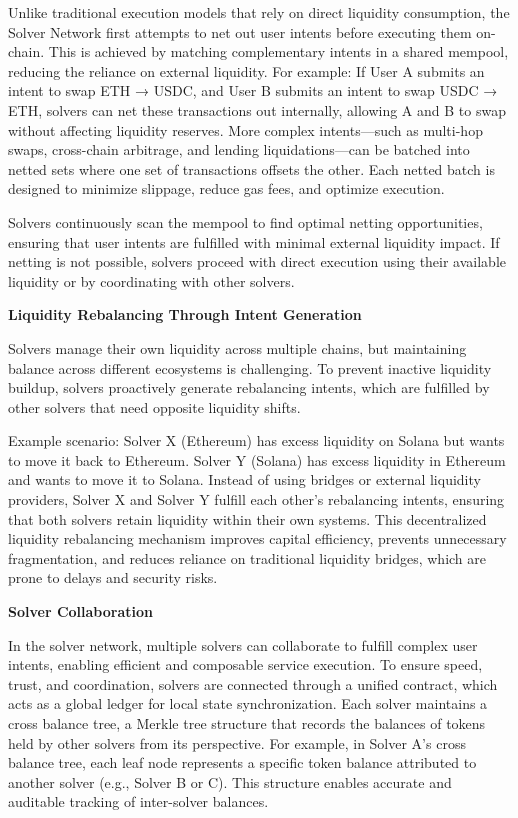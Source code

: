 Unlike traditional execution models that rely on direct liquidity consumption, the Solver Network first attempts to net out user intents before executing them on-chain. This is achieved by matching complementary intents in a shared mempool, reducing the reliance on external liquidity. For example: If User A submits an intent to swap ETH → USDC, and User B submits an intent to swap USDC → ETH, solvers can net these transactions out internally, allowing A and B to swap without affecting liquidity reserves. More complex intents—such as multi-hop swaps, cross-chain arbitrage, and lending liquidations—can be batched into netted sets where one set of transactions offsets the other. Each netted batch is designed to minimize slippage, reduce gas fees, and optimize execution.

Solvers continuously scan the mempool to find optimal netting opportunities, ensuring that user intents are fulfilled with minimal external liquidity impact. If netting is not possible, solvers proceed with direct execution using their available liquidity or by coordinating with other solvers.

\textbf{Liquidity Rebalancing Through Intent Generation}

Solvers manage their own liquidity across multiple chains, but maintaining balance across different ecosystems is challenging. To prevent inactive liquidity buildup, solvers proactively generate rebalancing intents, which are fulfilled by other solvers that need opposite liquidity shifts.

Example scenario: Solver X (Ethereum) has excess liquidity on Solana but wants to move it back to Ethereum. Solver Y (Solana) has excess liquidity in Ethereum and wants to move it to Solana.
Instead of using bridges or external liquidity providers, Solver X and Solver Y fulfill each other's rebalancing intents, ensuring that both solvers retain liquidity within their own systems. This decentralized liquidity rebalancing mechanism improves capital efficiency, prevents unnecessary fragmentation, and reduces reliance on traditional liquidity bridges, which are prone to delays and security risks.

\textbf{Solver Collaboration}


In the solver network, multiple solvers can collaborate to fulfill complex user intents, enabling efficient and composable service execution. To ensure speed, trust, and coordination, solvers are connected through a unified contract, which acts as a global ledger for local state synchronization. Each solver maintains a cross balance tree, a Merkle tree structure that records the balances of tokens held by other solvers from its perspective. For example, in Solver A’s cross balance tree, each leaf node represents a specific token balance attributed to another solver (e.g., Solver B or C). This structure enables accurate and auditable tracking of inter-solver balances.

